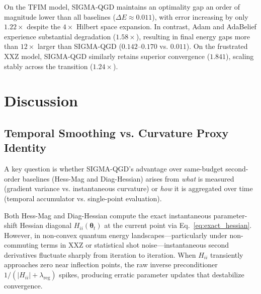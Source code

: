 \documentclass[11pt,a4paper]{article}
\begin{document}
On the TFIM model, SIGMA-QGD maintains an optimality gap an order of magnitude lower than all baselines ($\Delta E \approx 0.011$), with error increasing by only $1.22\times$ despite the $4\times$ Hilbert space expansion. In contrast, Adam and AdaBelief experience substantial degradation ($1.58\times$), resulting in final energy gaps more than $12\times$ larger than SIGMA-QGD ($0.142\text{--}0.170$ vs. $0.011$). On the frustrated XXZ model, SIGMA-QGD similarly retains superior convergence ($1.841$), scaling stably across the transition ($1.24\times$).

\section{Discussion}
\label{sec:discussion}

\subsection{Temporal Smoothing vs. Curvature Proxy Identity}
A key question is whether SIGMA-QGD's advantage over same-budget second-order baselines (Hess-Mag and Diag-Hessian) arises from \emph{what} is measured (gradient variance vs. instantaneous curvature) or \emph{how} it is aggregated over time (temporal accumulator vs. single-point evaluation).

Both Hess-Mag and Diag-Hessian compute the exact instantaneous parameter-shift Hessian diagonal $H_{ii}(\boldsymbol{\theta}_t)$ at the current point via Eq.~\eqref{eq:exact_hessian}. However, in non-convex quantum energy landscapes—particularly under non-commuting terms in XXZ or statistical shot noise—instantaneous second derivatives fluctuate sharply from iteration to iteration. When $H_{ii}$ transiently approaches zero near inflection points, the raw inverse preconditioner $1/(|H_{ii}| + \lambda_{\text{reg}})$ spikes, producing erratic parameter updates that destabilize convergence.
\end{document}
